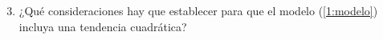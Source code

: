 \documentclass[../main.tex]{subfiles}
\begin{document}
    \begin{demostracion}
    	
    \end{demostracion}
    \vspace{1em}
    
    \begin{enunciado}
    	\begin{enumerate}
            \setcounter{enumi}{2}
    		\item ¿Qué consideraciones hay que establecer para que el modelo (\ref{1:modelo}) incluya una tendencia cuadrática?
    	\end{enumerate}

    \end{enunciado}
    
    \begin{demostracion}
    	
    \end{demostracion}
    \vspace{1em}
\end{document}
